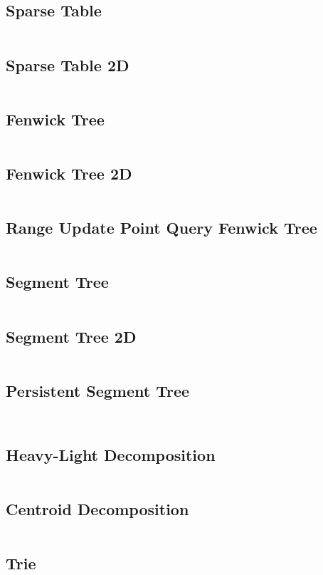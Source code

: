 \documentclass[a4paper, 10pt, twocolumn, landscape]{article}
\begin{document}
\subsection{Sparse Table}
\inputminted{cpp}{data-structures/sparse.cpp}
\subsection{Sparse Table 2D}
\inputminted{cpp}{data-structures/sparse2d.cpp}
\subsection{Fenwick Tree}
\inputminted{cpp}{data-structures/bit.cpp}
\subsection{Fenwick Tree 2D}
\inputminted{cpp}{data-structures/bit2d.cpp}
\subsection{Range Update Point Query Fenwick Tree}
\inputminted{cpp}{data-structures/bit-range.cpp}
\subsection{Segment Tree}
\inputminted{cpp}{data-structures/segtree.cpp}
\subsection{Segment Tree 2D}
\inputminted{cpp}{data-structures/segtree2d.cpp}
\subsection{Persistent Segment Tree}
\inputminted{cpp}{data-structures/persistent-segtree.cpp}
\inputminted{cpp}{data-structures/persistent-segtree-naum.cpp}
\subsection{Heavy-Light Decomposition}
\inputminted{cpp}{data-structures/hld.cpp}
\subsection{Centroid Decomposition}
\inputminted{cpp}{data-structures/centroid-decomposition.cpp}
\subsection{Trie}
\inputminted{cpp}{data-structures/trie.cpp}
\end{document}
